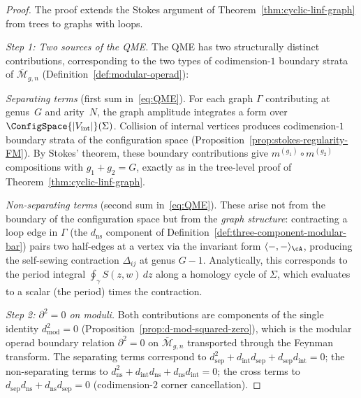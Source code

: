 \begin{proof}
The proof extends the Stokes argument of
Theorem~\ref{thm:cyclic-linf-graph} from trees to graphs with loops.

\emph{Step 1: Two sources of the QME.}
The QME has two structurally distinct contributions,
corresponding to the two types of codimension-$1$ boundary
strata of $\overline{\mathcal{M}}_{g,n}$
(Definition~\ref{def:modular-operad}):

\emph{Separating terms} (first sum in~\eqref{eq:QME}).
For each graph $\Gamma$ contributing at genus~$G$ and arity~$N$,
the graph amplitude integrates a form over
$\ConfigSpace{|V_{\mathrm{int}}|}(\Sigma)$.
Collision of internal vertices produces codimension-$1$ boundary
strata of the configuration space
(Proposition~\ref{prop:stokes-regularity-FM}).
By Stokes' theorem, these boundary contributions give
$m^{(g_1)} \circ m^{(g_2)}$ compositions with $g_1 + g_2 = G$,
exactly as in the tree-level proof of
Theorem~\ref{thm:cyclic-linf-graph}.

\emph{Non-separating terms} (second sum in~\eqref{eq:QME}).
These arise not from the boundary of the configuration space but
from the \emph{graph structure}: contracting a loop edge in
$\Gamma$ (the $d_{\mathrm{ns}}$ component of
Definition~\ref{def:three-component-modular-bar})
pairs two half-edges at a vertex via the invariant form
$\langle -, - \rangle_\cA$, producing the self-sewing contraction
$\Delta_{ij}$ at genus $G - 1$.
Analytically, this corresponds to the period integral
$\oint_\gamma S(z, w)\, dz$ along a homology cycle of $\Sigma$,
which evaluates to a scalar (the period) times the contraction.

\emph{Step 2: $\partial^2 = 0$ on moduli.}
Both contributions are components of the single identity
$d_{\mathrm{mod}}^2 = 0$
(Proposition~\ref{prop:d-mod-squared-zero}),
which is the modular operad boundary relation
$\partial^2 = 0$ on $\overline{\mathcal{M}}_{g,n}$
transported through the Feynman transform.
The separating terms correspond to
$d_{\mathrm{sep}}^2 + d_{\mathrm{int}} d_{\mathrm{sep}}
+ d_{\mathrm{sep}} d_{\mathrm{int}} = 0$;
the non-separating terms to
$d_{\mathrm{ns}}^2 + d_{\mathrm{int}} d_{\mathrm{ns}}
+ d_{\mathrm{ns}} d_{\mathrm{int}} = 0$;
the cross terms to
$d_{\mathrm{sep}} d_{\mathrm{ns}}
+ d_{\mathrm{ns}} d_{\mathrm{sep}} = 0$
(codimension-$2$ corner cancellation).
\end{proof}

